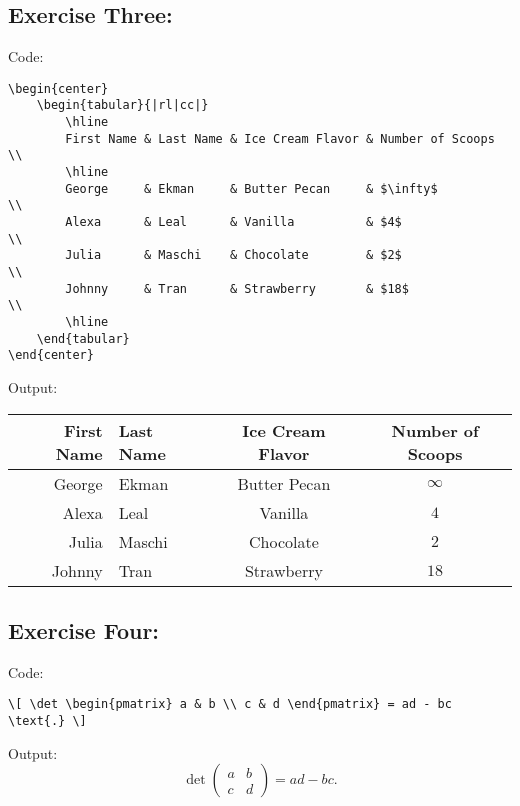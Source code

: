 \documentclass{article} %
\begin{document}
\subsection*{Exercise Three:}
Code:
\begin{verbatim}
\begin{center}
	\begin{tabular}{|rl|cc|}
		\hline
		First Name & Last Name & Ice Cream Flavor & Number of Scoops \\
		\hline
		George     & Ekman     & Butter Pecan     & $\infty$         \\
		Alexa      & Leal      & Vanilla          & $4$              \\
		Julia      & Maschi    & Chocolate        & $2$              \\
		Johnny     & Tran      & Strawberry       & $18$             \\
		\hline
	\end{tabular}
\end{center}
\end{verbatim}
Output:
\begin{center}
	\begin{tabular}{|rl|cc|}
		\hline
		First Name & Last Name & Ice Cream Flavor & Number of Scoops \\
		\hline
		George     & Ekman     & Butter Pecan     & $\infty$         \\
		Alexa      & Leal      & Vanilla          & $4$              \\
		Julia      & Maschi    & Chocolate        & $2$              \\
		Johnny     & Tran      & Strawberry       & $18$             \\
		\hline
	\end{tabular}
\end{center}

\subsection*{Exercise Four:}
Code:
\begin{verbatim}
\[ \det \begin{pmatrix} a & b \\ c & d \end{pmatrix} = ad - bc \text{.} \]
\end{verbatim}
Output:
\[ \det \begin{pmatrix} a & b \\ c & d \end{pmatrix} = ad - bc \text{.} \]
\end{document}
